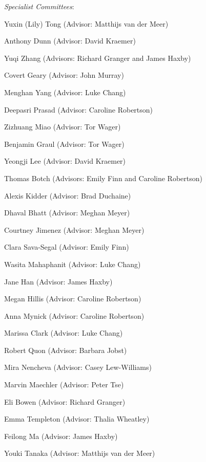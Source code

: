 \documentclass[11pt, a4paper]{article} %
\begin{document}
\textit{Specialist Committees}:
\begin{etaremune}
\item Yuxin (Lily) Tong (Advisor: Matthijs van der Meer)
\item Anthony Dunn (Advisor: David Kraemer)
\item Yuqi Zhang (Advisors: Richard Granger and James Haxby)
\item Covert Geary (Advisor: John Murray)
\item Menghan Yang (Advisor: Luke Chang)
\item Deepasri Prasad (Advisor: Caroline Robertson)
\item Zizhuang Miao (Advisor: Tor Wager)
\item Benjamin Graul (Advisor: Tor Wager)
\item Yeongji Lee (Advisor: David Kraemer)
\item Thomas Botch (Advisors: Emily Finn and Caroline Robertson)
\item Alexis Kidder (Advisor: Brad Duchaine)
\item Dhaval Bhatt (Advisor: Meghan Meyer)
\item Courtney Jimenez (Advisor: Meghan Meyer)
\item Clara Sava-Segal (Advisor: Emily Finn)
\item Wasita Mahaphanit (Advisor: Luke Chang)
\item Jane Han (Advisor: James Haxby)
\item Megan Hillis (Advisor: Caroline Robertson)
\item Anna Mynick (Advisor: Caroline Robertson)
\item Marissa Clark (Advisor: Luke Chang)
\item Robert Quon (Advisor: Barbara Jobst)
\item Mira Nencheva (Advisor: Casey Lew-Williams)
\item Marvin Maechler (Advisor: Peter Tse)
\item Eli Bowen (Advisor: Richard Granger)
\item Emma Templeton (Advisor: Thalia Wheatley)
\item Feilong Ma (Advisor: James Haxby)
\item Youki Tanaka (Advisor: Matthijs van der Meer)
\end{etaremune}
\end{document}
